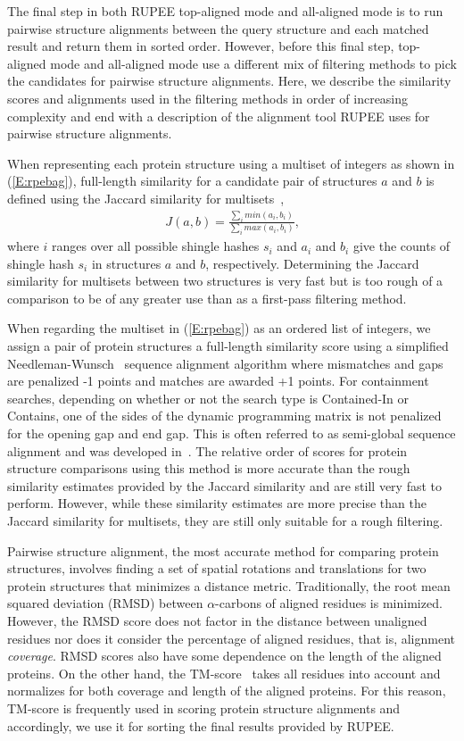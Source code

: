 \documentclass[10pt,letterpaper]{article}
\newcommand{\cas}{$\alpha$-carbons\xspace}
\begin{document}
The final step in both RUPEE top-aligned mode and all-aligned mode is to run pairwise structure alignments between the query structure and each matched result and return them in sorted order. 
However, before this final step, top-aligned mode and all-aligned mode use a different mix of filtering methods to pick the candidates for pairwise structure alignments. 
Here, we describe the similarity scores and alignments used in the filtering methods in order of increasing complexity and end with a description of the alignment tool RUPEE uses for pairwise structure alignments. 

When representing each protein structure using a multiset of integers as shown in (\ref{E:rpebag}), full-length similarity for a candidate pair of structures $a$ and $b$ is defined using the Jaccard similarity for multisets~\cite{Levan1971},
\begin{align}
    J(a,b) = \frac{\sum_i min(a_i, b_i)}{\sum_i max(a_i,b_i)}\text{,}
\end{align}
where $i$ ranges over all possible shingle hashes $s_i$ and $a_i$ and $b_i$ give the counts of shingle hash $s_i$ in structures $a$ and $b$, respectively. 
Determining the Jaccard similarity for multisets between two structures is very fast but is too rough of a comparison to be of any greater use than as a first-pass filtering method. 

When regarding the multiset in (\ref{E:rpebag}) as an ordered list of integers, we assign a pair of protein structures a full-length similarity score using a simplified Needleman-Wunsch~\cite{Needleman1970} sequence alignment algorithm where mismatches and gaps are penalized -1 points and matches are awarded +1 points.
For containment searches, depending on whether or not the search type is Contained-In or Contains, one of the sides of the dynamic programming matrix is not penalized for the opening gap and end gap.
This is often referred to as semi-global sequence alignment and was developed in~\cite{Brudno2003}. 
The relative order of scores for protein structure comparisons using this method is more accurate than the rough similarity estimates provided by the Jaccard similarity and are still very fast to perform. 
However, while these similarity estimates are more precise than the Jaccard similarity for multisets, they are still only suitable for a rough filtering. 

Pairwise structure alignment, the most accurate method for comparing protein structures, involves finding a set of spatial rotations and translations for two protein structures that minimizes a distance metric. 
Traditionally, the root mean squared deviation (RMSD) between \cas of aligned residues is minimized.
However, the RMSD score does not factor in the distance between unaligned residues nor does it consider the percentage of aligned residues, that is, alignment \emph{coverage}. 
RMSD scores also have some dependence on the length of the aligned proteins. 
On the other hand, the TM-score~\cite{Zhang2004} takes all residues into account and normalizes for both coverage and length of the aligned proteins. 
For this reason, TM-score is frequently used in scoring protein structure alignments and accordingly, we use it for sorting the final results provided by RUPEE.
\end{document}
